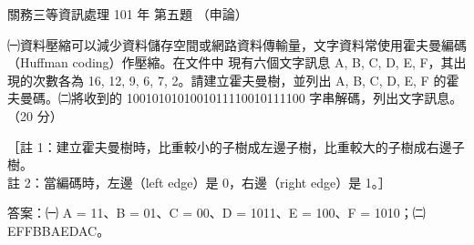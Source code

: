 \begin{pastexam}[label={px:gw3-101-ds-05}]{關務三等資訊處理 101 年 第五題}
（申論）

㈠資料壓縮可以減少資料儲存空間或網路資料傳輸量，文字資料常使用霍夫曼編碼（Huffman coding）作壓縮。在文件中
現有六個文字訊息 A, B, C, D, E, F，其出現的次數各為 16, 12, 9, 6, 7, 2。請建立霍夫曼樹，並列出 A, B, C, D, E, F
的霍夫曼碼。㈡將收到的 1001010101001011110010111100 字串解碼，列出文字訊息。（20 分）

［註 1：建立霍夫曼樹時，比重較小的子樹成左邊子樹，比重較大的子樹成右邊子樹。\\
\phantom{［}註 2：當編碼時，左邊（left edge）是 0，右邊（right edge）是 1。］
\end{pastexam}

\begin{pastsoln}
答案：㈠ A = 11、B = 01、C = 00、D = 1011、E = 100、F = 1010；㈡ EFFBBAEDAC。


\end{pastsoln}
